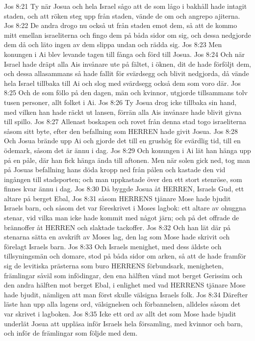 Jos 8:21  Ty när Josua och hela Israel sågo att de som lågo i bakhåll hade intagit staden, och att röken steg upp från staden, vände de om och angrepo ajiterna.
Jos 8:22  De andra drogo nu också ut från staden emot dem, så att de kommo mitt emellan israeliterna och fingo dem på båda sidor om sig, och dessa nedgjorde dem då och läto ingen av dem slippa undan och rädda sig.
Jos 8:23  Men konungen i Ai blev levande tagen till fånga och förd till Josua.
Jos 8:24  Och när Israel hade dräpt alla Ais invånare ute på fältet, i öknen, dit de hade förföljt dem, och dessa allasammans så hade fallit för svärdsegg och blivit nedgjorda, då vände hela Israel tillbaka till Ai och slog med svärdsegg också dem som voro där.
Jos 8:25  Och de som föllo på den dagen, män och kvinnor, utgjorde tillsammans tolv tusen personer, allt folket i Ai.
Jos 8:26  Ty Josua drog icke tillbaka sin hand, med vilken han hade räckt ut lansen, förrän alla Ais invånare hade blivit givna till spillo.
Jos 8:27  Allenast boskapen och rovet från denna stad togo israeliterna såsom sitt byte, efter den befallning som HERREN hade givit Josua.
Jos 8:28  Och Josua brände upp Ai och gjorde det till en grushög för evärdlig tid, till en ödemark, såsom det är ännu i dag.
Jos 8:29  Och konungen i Ai lät han hänga upp på en påle, där han fick hänga ända till aftonen. Men när solen gick ned, tog man på Josuas befallning hans döda kropp ned från pålen och kastade den vid ingången till stadsporten; och man uppkastade över den ett stort stenröse, som finnes kvar ännu i dag.
Jos 8:30  Då byggde Josua åt HERREN, Israels Gud, ett altare på berget Ebal,
Jos 8:31  såsom HERRENS tjänare Mose hade bjudit Israels barn, och såsom det var föreskrivet i Moses lagbok: ett altare av ohuggna stenar, vid vilka man icke hade kommit med något järn; och på det offrade de brännoffer åt HERREN och slaktade tackoffer.
Jos 8:32  Och han lät där på stenarna sätta en avskrift av Moses lag, den lag som Mose hade skrivit och förelagt Israels barn.
Jos 8:33  Och Israels menighet, med dess äldste och tillsyningsmän och domare, stod på båda sidor om arken, så att de hade framför sig de levitiska prästerna som buro HERRENS förbundsark, menigheten, främlingar såväl som infödingar, den ena hälften vänd mot berget Gerissim och den andra hälften mot berget Ebal, i enlighet med vad HERRENS tjänare Mose hade bjudit, nämligen att man först skulle välsigna Israels folk.
Jos 8:34  Därefter läste han upp alla lagens ord, välsignelsen och förbannelsen, alldeles såsom det var skrivet i lagboken.
Jos 8:35  Icke ett ord av allt det som Mose hade bjudit underlät Josua att uppläsa inför Israels hela församling, med kvinnor och barn, och inför de främlingar som följde med dem.
